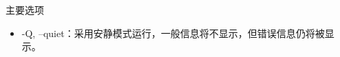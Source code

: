 \begin{frame}{主要选项}
\begin{itemize}
   \item -Q, --quiet：采用安静模式运行，一般信息将不显示，但错误信息仍将被显示。

%


\end{itemize}
\end{frame}
